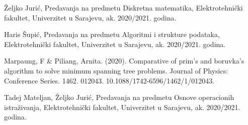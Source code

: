 \documentclass[conference]{IEEEtran}
\begin{document}
\begin{thebibliography}{00}
 Željko Jurić, Predavanja na predmetu Diskretna matematika, Elektrotehnički fakultet, Univerzitet u Sarajevu, ak. 2020/2021. godina.

 Haris Šupić, Predavanja na predmetu Algoritmi i strukture podataka, Elektrotehnički fakultet, Univerzitet u Sarajevu, ak. 2020/2021. godina.

 Marpaung, F \& Piliang, Arnita. (2020). Comparative of prim’s and boruvka’s algorithm to solve minimum spanning tree problems. Journal of Physics: Conference Series. 1462. 012043. 10.1088/1742-6596/1462/1/012043. 

 Tadej Mateljan, Željko Jurić, Predavanja na predmetu Osnove operacionih istraživanja, Elektrotehnički fakultet, Univerzitet u Sarajevu, ak. 2020/2021. godina.


\end{thebibliography}
\end{document}
